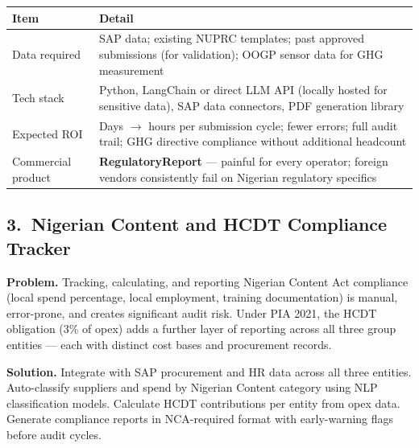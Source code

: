 \documentclass[10pt]{article}
\begin{document}
\vspace{4pt}
\small
\begin{tabularx}{\columnwidth}{@{}lX@{}}
\toprule
\textbf{Item} & \textbf{Detail} \\
\midrule
Data required     & SAP data; existing NUPRC templates; past approved submissions
                    (for validation); OOGP sensor data for GHG measurement \\
Tech stack        & Python, LangChain or direct LLM API (locally hosted for sensitive data),
                    SAP data connectors, PDF generation library \\
Expected ROI      & Days $\to$ hours per submission cycle; fewer errors; full audit trail;
                    GHG directive compliance without additional headcount \\
Commercial product & \textbf{RegulatoryReport} --- painful for every operator; foreign
                    vendors consistently fail on Nigerian regulatory specifics \\
\bottomrule
\end{tabularx}
\normalsize

\vspace{8pt}

\subsection*{3.\ Nigerian Content and HCDT Compliance Tracker}

{\small
\textbf{Problem.}
Tracking, calculating, and reporting Nigerian Content Act compliance (local spend
percentage, local employment, training documentation) is manual, error-prone, and
creates significant audit risk. Under PIA 2021, the HCDT obligation (3\% of opex)
adds a further layer of reporting across all three group entities --- each with
distinct cost bases and procurement records.

\vspace{4pt}
\textbf{Solution.}
Integrate with SAP procurement and HR data across all three entities. Auto-classify
suppliers and spend by Nigerian Content category using NLP classification models.
Calculate HCDT contributions per entity from opex data. Generate compliance reports
in NCA-required format with early-warning flags before audit cycles.
}
\end{document}
